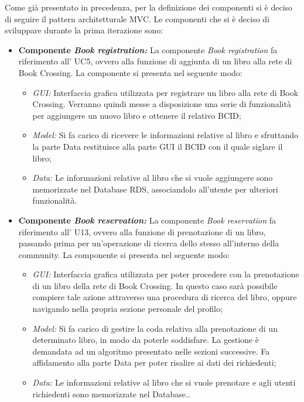 Come già presentato in precedenza, per la definizione dei componenti si è deciso di seguire il pattern architetturale MVC. 
Le componenti che si è deciso di sviluppare durante la prima iterazione sono: 
\begin{itemize}
	\item \textbf{Componente \textit{Book registration:}} La componente \textit{Book registration} fa riferimento all’ UC5, ovvero alla funzione di aggiunta di un libro alla rete di Book Crossing. La componente si presenta nel seguente modo:
	\begin{itemize}
		\item \textit{GUI:} Interfaccia grafica utilizzata per registrare un libro alla rete di Book Crossing. Verranno quindi messe a disposizione una serie di funzionalità per aggiungere un nuovo libro e ottenere il relativo BCID;
		\item \textit{Model:} Si fa carico di ricevere le informazioni relative al libro e sfruttando la parte Data restituisce alla parte GUI il BCID con il quale siglare il libro;
		\item \textit{Data:} Le informazioni relative al libro che si vuole aggiungere sono memorizzate nel Database RDS, associandolo all’utente per ulteriori funzionalità. 
	\end{itemize}
	\item \textbf{Componente \textit{Book reservation:}}  La componente \textit{Book reservation} fa riferimento all’ U13, ovvero alla funzione di prenotazione di un libro, passando prima per un'operazione di ricerca dello stesso all'interno della community. La componente si presenta nel seguente modo:
	\begin{itemize}
		\item \textit{GUI:} Interfaccia grafica utilizzata per poter procedere con la prenotazione di un libro della rete di Book Crossing. In questo caso sarà possibile compiere tale azione attraverso una procedura di ricerca del libro, oppure navigando nella propria sezione personale del profilo;
		\item \textit{Model:} Si fa carico di gestire la coda relativa alla prenotazione di un determinato libro, in modo da poterle soddisfare. La gestione è demandata ad un algoritmo presentato nelle sezioni successive. Fa affidamento alla parte Data per poter risalire ai dati dei richiedenti;
		\item \textit{Data:} Le informazioni relative al libro che si vuole prenotare e agli utenti richiedenti sono memorizzate nel Database.. 
	\end{itemize}
\end{itemize}